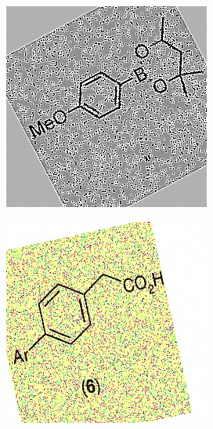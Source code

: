 \begin{figure}[H]
\centering
    \begin{subfigure}{.35\textwidth}
        \centering
        \includegraphics[width=1\linewidth]{imagenes/aug3/175.jpg}
    \end{subfigure}%
    \begin{subfigure}{.35\textwidth}
        \centering
        \includegraphics[width=1\linewidth]{imagenes/aug3/183.jpg}
    \end{subfigure}%


\end{figure}
